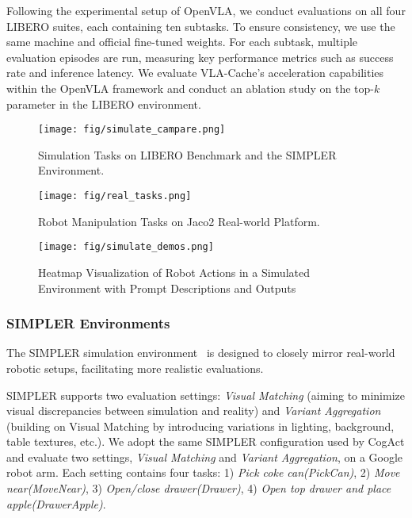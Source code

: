 Following the experimental setup of OpenVLA, we conduct evaluations on all four LIBERO suites, each containing ten subtasks. To ensure consistency, we use the same machine and official fine-tuned weights. For each subtask, multiple evaluation episodes are run, measuring key performance metrics such as success rate and inference latency. We evaluate VLA-Cache’s acceleration capabilities within the OpenVLA framework and conduct an ablation study on the top-$k$ parameter in the LIBERO environment.



\begin{figure}[!t]
    \centering
    \texttt{[image: fig/simulate\_campare.png]}
    \caption{Simulation Tasks on LIBERO Benchmark and the SIMPLER Environment.}
    \label{fig:simulate_campare}
\vskip -0.1in
\end{figure}
\begin{figure}[!t] 
    \centering
    \texttt{[image: fig/real\_tasks.png]} 
    \caption{Robot Manipulation Tasks on Jaco2 Real-world Platform.}
    \label{fig:example}
\vskip -0.2in
\end{figure}

\begin{figure*}[!t]
\centering
{\texttt{[image: fig/simulate\_demos.png]}}
\vskip -0.1in
\caption{Heatmap Visualization of Robot Actions in a Simulated Environment with Prompt Descriptions and Outputs}
\end{figure*}




\subsubsection{SIMPLER Environments}
The SIMPLER simulation environment~\cite{li2024evaluating} is designed to closely mirror real-world robotic setups, facilitating more realistic evaluations.

SIMPLER supports two evaluation settings: \emph{Visual Matching} (aiming to minimize visual discrepancies between simulation and reality) and \emph{Variant Aggregation} (building on Visual Matching by introducing variations in lighting, background, table textures, etc.). We adopt the same SIMPLER configuration used by CogAct and evaluate two settings, \emph{Visual Matching} and \emph{Variant Aggregation}, on a Google robot arm. Each setting contains four tasks: 1) \emph{Pick coke can(PickCan)}, 2) \emph{Move near(MoveNear)}, 3) \emph{Open/close drawer(Drawer)}, 4) \emph{Open top drawer and place apple(DrawerApple)}.

